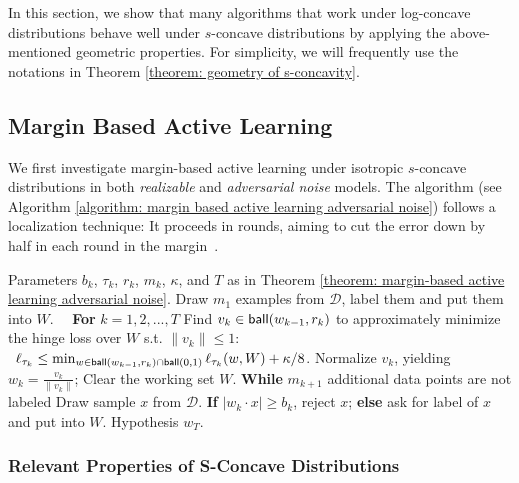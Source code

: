 \documentclass[11pt]{article}
\newcommand{\cD}{\mathcal{D}}
\newcommand{\ball}{\textup{\textsf{ball}}}
\begin{document}
In this section, we show that many algorithms that work under log-concave distributions behave well under $s$-concave distributions by applying the above-mentioned geometric properties. For simplicity, we will frequently use the notations in Theorem \ref{theorem: geometry of s-concavity}.

\subsection{Margin Based Active Learning}

We first investigate margin-based active learning under isotropic $s$-concave distributions in both \emph{realizable} and \emph{adversarial noise} models. The algorithm (see Algorithm \ref{algorithm: margin based active learning adversarial noise}) follows a localization technique: It proceeds in rounds, aiming to cut the error down by half in each round in the margin~\cite{balcan2007margin}.


\begin{algorithm}[h]
\footnotesize
\caption{Margin Based Active Learning under S-Concave Distributions}
\begin{algorithmic}
\label{algorithm: margin based active learning adversarial noise}
 Parameters $b_k$, $\tau_k$, $r_k$, $m_k$, $\kappa$, and $T$ as in Theorem \ref{theorem: margin-based active learning adversarial noise}.
 Draw $m_1$ examples from $\cD$, label them and put them into $W$.
 \ \ \textbf{For} $k=1,2,...,T$
 \quad Find $v_k\in \ball(w_{k-1},r_k)$ to approximately minimize the hinge loss over $W$ s.t. $\|v_k\|\le 1$:\\
\qquad\ $\ell_{\tau_k}\le \min_{w\in \ball(w_{k-1},r_k)\cap \ball(0,1)} \ell_{\tau_k}(w,W)+\kappa/8$.
 \quad Normalize $v_k$, yielding $w_k=\frac{v_k}{\|v_k\|}$; Clear the working set $W$.
 \quad \textbf{While} $m_{k+1}$ additional data points are not labeled
 \quad \quad Draw sample $x$ from $\cD$.
 \quad \quad \textbf{If} $|w_k\cdot x|\ge b_k$, reject $x$; \textbf{else} ask for label of $x$ and put into $W$.
 Hypothesis $w_T$.
\end{algorithmic}
\end{algorithm}



\subsubsection{Relevant Properties of S-Concave Distributions}
\end{document}
